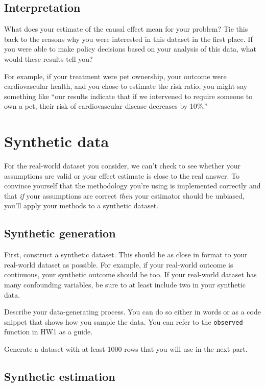 \documentclass[12pt]{article}
\begin{document}
\subsection{Interpretation}

What does your estimate of the causal effect mean for your problem?  Tie this
back to the reasons why you were interested in this dataset in the first place.
If you were able to make policy decisions based on your analysis of this data,
what would these results tell you?

For example, if your treatment were pet ownership, your outcome were
cardiovascular health, and you chose to estimate the risk ratio, you might say
something like ``our results indicate that if we intervened to require someone
to own a pet, their risk of cardiovascular disease decreases by 10\%.''

\section{Synthetic data} \label{sec:synthetic}

For the real-world dataset you consider, we can't check to see whether your
assumptions are valid or your effect estimate is close to the real answer.  To
convince yourself that the methodology you're using is implemented correctly
and that \emph{if} your assumptions are correct \emph{then} your estimator
should be unbiased, you'll apply your methods to a synthetic dataset. 

\subsection{Synthetic generation}

First, construct a synthetic dataset. This should be as close in format to
your real-world dataset as possible. For example, if your real-world outcome is
continuous, your synthetic outcome should be too. If your real-world dataset
has many confounding variables, be sure to at least include two in your
synthetic data.

Describe your data-generating process. You can do so either in words or as a
code snippet that shows how you sample the data. You can refer to the
\texttt{observed} function in HW1 as a guide.

Generate a dataset with at least 1000 rows that you will use in the next part.

\subsection{Synthetic estimation}
\end{document}
